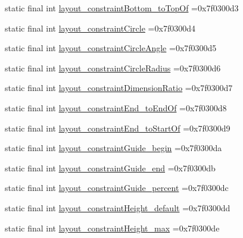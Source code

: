 \begin{DoxyCompactItemize}
\item 
static final int \mbox{\hyperlink{classcom_1_1example_1_1trainawearapplication_1_1_r_1_1attr_a72f8694d56ba40f8e2b1dddc99f3b677}{layout\+\_\+constraint\+Bottom\+\_\+to\+Top\+Of}} =0x7f0300d3
\item 
static final int \mbox{\hyperlink{classcom_1_1example_1_1trainawearapplication_1_1_r_1_1attr_a2d0fc0da56776452dd131901500e1063}{layout\+\_\+constraint\+Circle}} =0x7f0300d4
\item 
static final int \mbox{\hyperlink{classcom_1_1example_1_1trainawearapplication_1_1_r_1_1attr_a6718a0d93dbb6259ed8c9e49c0c62631}{layout\+\_\+constraint\+Circle\+Angle}} =0x7f0300d5
\item 
static final int \mbox{\hyperlink{classcom_1_1example_1_1trainawearapplication_1_1_r_1_1attr_a20c8fa314b046feb0ab027201d05f11b}{layout\+\_\+constraint\+Circle\+Radius}} =0x7f0300d6
\item 
static final int \mbox{\hyperlink{classcom_1_1example_1_1trainawearapplication_1_1_r_1_1attr_ae8df2c3c86831da7a0d4dc70749edc1f}{layout\+\_\+constraint\+Dimension\+Ratio}} =0x7f0300d7
\item 
static final int \mbox{\hyperlink{classcom_1_1example_1_1trainawearapplication_1_1_r_1_1attr_adf33cd682140f67e52f9397285432ea3}{layout\+\_\+constraint\+End\+\_\+to\+End\+Of}} =0x7f0300d8
\item 
static final int \mbox{\hyperlink{classcom_1_1example_1_1trainawearapplication_1_1_r_1_1attr_abd8a857255a342b93f6fd3c6347f6607}{layout\+\_\+constraint\+End\+\_\+to\+Start\+Of}} =0x7f0300d9
\item 
static final int \mbox{\hyperlink{classcom_1_1example_1_1trainawearapplication_1_1_r_1_1attr_a5375a3b18c2ac1e6d41bbbd181594fdd}{layout\+\_\+constraint\+Guide\+\_\+begin}} =0x7f0300da
\item 
static final int \mbox{\hyperlink{classcom_1_1example_1_1trainawearapplication_1_1_r_1_1attr_afb10d226537df3f1314fa03048e468aa}{layout\+\_\+constraint\+Guide\+\_\+end}} =0x7f0300db
\item 
static final int \mbox{\hyperlink{classcom_1_1example_1_1trainawearapplication_1_1_r_1_1attr_a70b3288b97ea3bada8dfb40608d855e0}{layout\+\_\+constraint\+Guide\+\_\+percent}} =0x7f0300dc
\item 
static final int \mbox{\hyperlink{classcom_1_1example_1_1trainawearapplication_1_1_r_1_1attr_a3c743d4cbefab1c22ca077f9fa6ee7f3}{layout\+\_\+constraint\+Height\+\_\+default}} =0x7f0300dd
\item 
static final int \mbox{\hyperlink{classcom_1_1example_1_1trainawearapplication_1_1_r_1_1attr_a048a20d4f81ed64001ae31f0e603e1b1}{layout\+\_\+constraint\+Height\+\_\+max}} =0x7f0300de

\end{DoxyCompactItemize}

